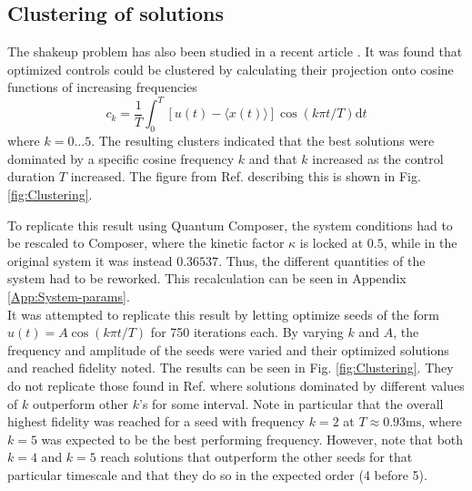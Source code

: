 \documentclass[a4paper, twocolumn]{revtex4-1}
\begin{document}
\subsection{Clustering of solutions}\label{subsec:composer-clustering}
The shakeup problem has also been studied in a recent article \cite{QM2Paper}. It was found that optimized controls could be clustered by calculating their projection onto cosine functions of increasing frequencies
\begin{equation}
	c_k = \frac{1}{T} \int_{0}^{T} [u(t) - \langle x(t)\rangle]\cos(k \pi t/T) \text{d}t
	\label{eq:QM2-ck-expression}
\end{equation}
where $k=0\dots5$. The resulting clusters indicated that the best solutions were dominated by a specific cosine frequency $k$ and that $k$ increased as the control duration $T$ increased. The figure from Ref.  \cite{QM2Paper} describing this is shown in Fig. \ref{fig:Clustering}.

To replicate this result using Quantum Composer, the system conditions had to be rescaled to Composer, where the kinetic factor $\kappa$ is locked at $0.5$, while in the original system it was instead $0.36537$. Thus, the different quantities of the system had to be reworked. This recalculation can be seen in Appendix \ref{App:System-params}.\\

It was attempted to replicate this result by letting  optimize seeds of the form $u(t) = A\cos(k\pi t/T)$ for 750 iterations each. By varying $k$ and $A$, the frequency and amplitude of the seeds were varied and their optimized solutions and reached fidelity noted. The results can be seen in Fig. \ref{fig:Clustering}. They do not replicate those found in Ref. \cite{QM2Paper} where solutions dominated by different values of $k$ outperform other $k$'s for some interval. Note in particular that the overall highest fidelity was reached for a seed with frequency $k=2$ at $ T\approx 0.93 \text{ms} $, where $ k=5 $ was expected to be the best performing frequency. However, note that both $k=4$ and $k=5$ reach solutions that outperform the other seeds for that particular timescale and that they do so in the expected order (4 before 5).\\
\end{document}
